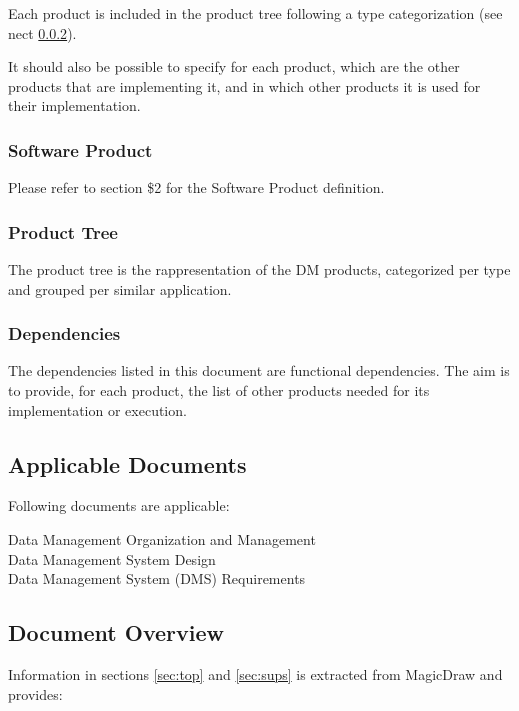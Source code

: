 Each product is included in the product tree following a type categorization (see nect \ref{sec:ptree}).

It should also be possible to specify for each product, which are the other products that are implementing it, and in which other products it is used for their implementation.


\subsubsection{Software Product} \label{sec:swproduct}

Please refer to  section \$2 for the Software Product definition.


\subsubsection{Product Tree} \label{sec:ptree}

The product tree is the rappresentation of the DM products, categorized per type and grouped per similar application.


\subsubsection{Dependencies} \label{sec:dependencies}

The dependencies listed in this document are functional dependencies.
The aim is to provide, for each product, the list of other products needed for its implementation or execution. 


\subsection{Applicable Documents}

Following documents are applicable:

 Data Management Organization and Management\\
 Data Management System Design\\
 Data Management System (DMS) Requirements


\subsection{Document Overview}

Information in sections \ref{sec:top} and \ref{sec:sups} is extracted from MagicDraw and provides:

